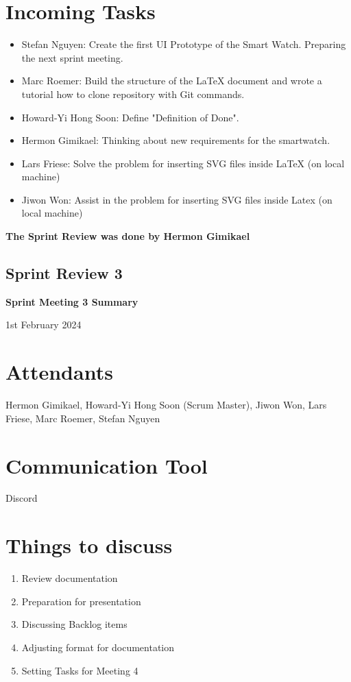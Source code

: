 \documentclass{article}
\begin{document}
\section*{Incoming Tasks}
\begin{itemize}
	\item Stefan Nguyen: Create the first UI Prototype of the Smart Watch. Preparing the next sprint meeting.
    \item Marc Roemer: Build the structure of the LaTeX document and wrote a tutorial how to clone repository with Git commands.
    \item Howard-Yi Hong Soon: Define "Definition of Done".
    \item Hermon Gimikael: Thinking about new requirements for the smartwatch.
    \item Lars Friese: Solve the problem for inserting SVG files inside LaTeX (on local machine)
    \item Jiwon Won: Assist in the problem for inserting SVG files inside Latex (on local machine)
\end{itemize}
\noindent
\textbf{The Sprint Review was done by Hermon Gimikael}
\newpage

\subsection{Sprint Review 3}
\begin{center}
    {\Large \textbf{Sprint Meeting 3 Summary}}
    
    \vspace{0.5cm}
    
    {\large 1st February 2024}
\end{center}

\section*{Attendants}
Hermon Gimikael, Howard-Yi Hong Soon (Scrum Master), Jiwon Won, Lars Friese, Marc Roemer, Stefan Nguyen

\section*{Communication Tool}
Discord

\section*{Things to discuss}
\begin{enumerate}
    \item Review documentation
    \item Preparation for presentation
    \item Discussing Backlog items
    \item Adjusting format for documentation
    \item Setting Tasks for Meeting 4
\end{enumerate}
\end{document}
